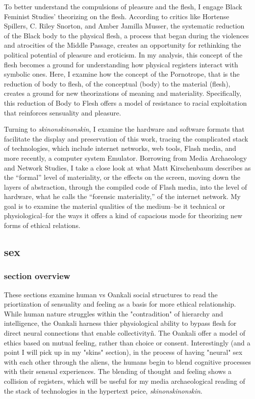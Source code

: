 \documentclass[11pt]{article}
\begin{document}
To better understand the compulsions of pleasure and the flesh, I
engage Black Feminist Studies’ theorizing on the flesh. According to
critics like Hortense Spillers, C. Riley Snorton, and Amber Jamilla
Musser, the systematic reduction of the Black body to the physical
flesh, a process that began during the violences and atrocities of the
Middle Passage, creates an opportunity for rethinking the political
potential of pleasure and eroticism. In my analysis, this concept of
the flesh becomes a ground for understanding how physical registers
interact with symbolic ones. Here, I examine how the concept of the
Pornotrope, that is the reduction of body to flesh, of the conceptual
(body) to the material (flesh), creates a ground for new theorizations
of meaning and materiality. Specifically, this reduction of Body to
Flesh offers a model of resistance to racial exploitation that
reinforces sensuality and pleasure.

Turning to \emph{skinonskinonskin}, I examine the hardware and software
formats that facilitate the display and preservation of this work,
tracing the complicated stack of technologies, which include internet
networks, web tools, Flash media, and more recently, a computer system
Emulator. Borrowing from Media Archaeology and Network Studies, I take
a close look at what Matt Kirschenbaum describes as the “formal” level
of materiality, or the effects on the screen, moving down the layers
of abstraction, through the compiled code of Flash media, into the
level of hardware, what he calls the “forensic materiality,” of the
internet network. My goal is to examine the material qualities of the
medium--be it technical or physiological--for the ways it offers a
kind of capacious mode for theorizing new forms of ethical relations.


\subsection{sex}
\label{sec:org36fdf20}
\subsubsection{section overview}
\label{sec:org338c009}
These sections examine human vs Oankali social structures to read the
priortization of sensuality and feeling as a basis for more ethical
relationship. While human nature struggles within the "contradition"
of hierarchy and intelligence, the Oankali harness thier physiological
ability to bypass flesh for direct neural connections that enable
collectivityñ. The Oankali offer a model of ethics based on mutual
feeling, rather than choice or consent. Interestingly (and a point I
will pick up in my "skins" section), in the process of having "neural"
sex with each other through the aliens, the humans begin to blend
cognitive processes with their sensual experiences. The blending of
thought and feeling shows a collision of registers, which will be
useful for my media archaeological reading of the stack of
technologies in the hypertext peice, \emph{skinonskinonskin}.
\end{document}
